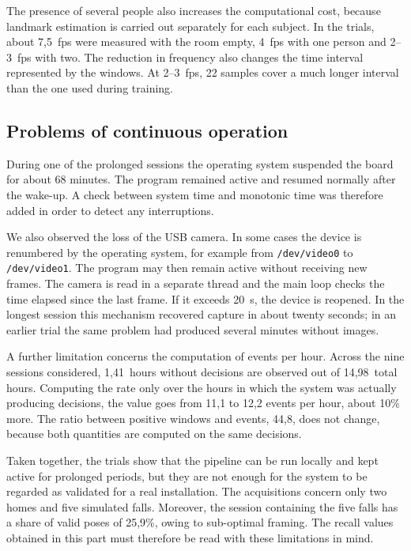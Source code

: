The presence of several people also increases the computational cost, because landmark estimation is carried out separately for each subject. In the trials, about 7,5~fps were measured with the room empty, 4~fps with one person and 2--3~fps with two. The reduction in frequency also changes the time interval represented by the windows. At 2--3~fps, 22 samples cover a much longer interval than the one used during training.

\subsection{Problems of continuous operation}
During one of the prolonged sessions the operating system suspended the board for about 68 minutes. The program remained active and resumed normally after the wake-up. A check between system time and monotonic time was therefore added in order to detect any interruptions.

We also observed the loss of the USB camera. In some cases the device is renumbered by the operating system, for example from \texttt{/dev/video0} to \texttt{/dev/video1}. The program may then remain active without receiving new frames. The camera is read in a separate thread and the main loop checks the time elapsed since the last frame. If it exceeds 20~s, the device is reopened. In the longest session this mechanism recovered capture in about twenty seconds; in an earlier trial the same problem had produced several minutes without images.

A further limitation concerns the computation of events per hour. Across the nine sessions considered, 1,41~hours without decisions are observed out of 14,98~total hours. Computing the rate only over the hours in which the system was actually producing decisions, the value goes from 11,1 to 12,2 events per hour, about 10\% more. The ratio between positive windows and events, 44,8, does not change, because both quantities are computed on the same decisions.

Taken together, the trials show that the pipeline can be run locally and kept active for prolonged periods, but they are not enough for the system to be regarded as validated for a real installation. The acquisitions concern only two homes and five simulated falls. Moreover, the session containing the five falls has a share of valid poses of 25,9\%, owing to sub-optimal framing. The recall values obtained in this part must therefore be read with these limitations in mind.

